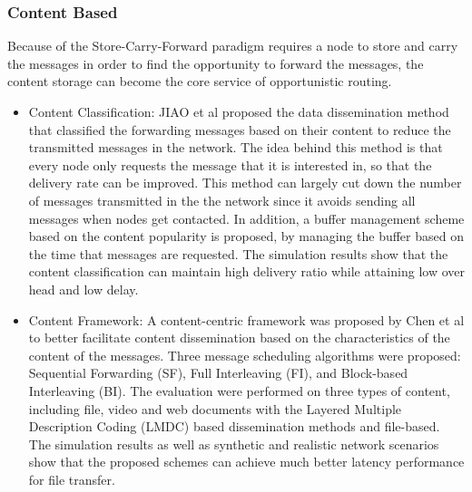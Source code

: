 \subsubsection{Content Based}
\label{bg:Opportunistic Networks:Classification of Opportunistic Routing:CTB}
Because of the Store-Carry-Forward paradigm requires a node to store and carry the messages in order to find the opportunity to forward the messages, the content storage can become the core service of opportunistic routing.
	\begin{itemize}
		\item Content Classification:
		JIAO et al \cite{Jiao2009} proposed the data dissemination method that classified the forwarding messages based on their content to reduce the transmitted messages in the network.
		The idea behind this method is that every node only requests the message that it is interested in, so that the delivery rate can be improved.
		This method can largely cut down the number of messages transmitted in the the network since it avoids sending all messages when nodes get contacted.
		In addition, a buffer management scheme based on the content popularity is proposed, by managing the buffer based on the time that messages are requested.
		The simulation results show that the content classification can maintain high delivery ratio while attaining low over head and low delay.

		\item Content Framework: 
		A content-centric framework was proposed by Chen et al \cite{Chen2008} to better facilitate content dissemination based on the characteristics of the content of the messages.
		Three message scheduling algorithms were proposed: Sequential Forwarding (SF), Full Interleaving (FI), and Block-based Interleaving (BI).
		The evaluation were performed on three types of content, including file, video and web documents with the Layered Multiple Description Coding (LMDC) based dissemination methods and file-based.
		The simulation results as well as synthetic and realistic network scenarios show that the proposed schemes can achieve much better latency performance for file transfer.

		
	\end{itemize}

